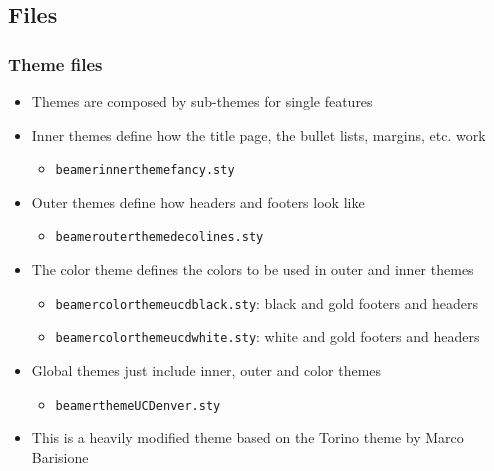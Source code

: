 \subsection{Files}
\begin{frame}[t,fragile]
    \frametitle{Theme files}
\begin{itemize}
\item Themes are composed by sub-themes for single features
\item Inner themes define how the title page, the bullet lists, margins,
      etc. work
  \begin{itemize}
    \item \verb!beamerinnerthemefancy.sty!
  \end{itemize}
\item Outer themes define how headers and footers look like
  \begin{itemize}
    \item \verb!beamerouterthemedecolines.sty!
  \end{itemize}
\item The color theme defines the colors to be used in outer and inner themes
  \begin{itemize}
    \item \verb!beamercolorthemeucdblack.sty!: black and gold footers and headers
    \item \verb!beamercolorthemeucdwhite.sty!: white and gold footers and headers
  \end{itemize}
\item Global themes just include inner, outer and color themes
  \begin{itemize}
    \item \verb!beamerthemeUCDenver.sty!
  \end{itemize}
  \item This is a heavily modified theme based on the Torino theme by Marco Barisione
\end{itemize}
\end{frame}

